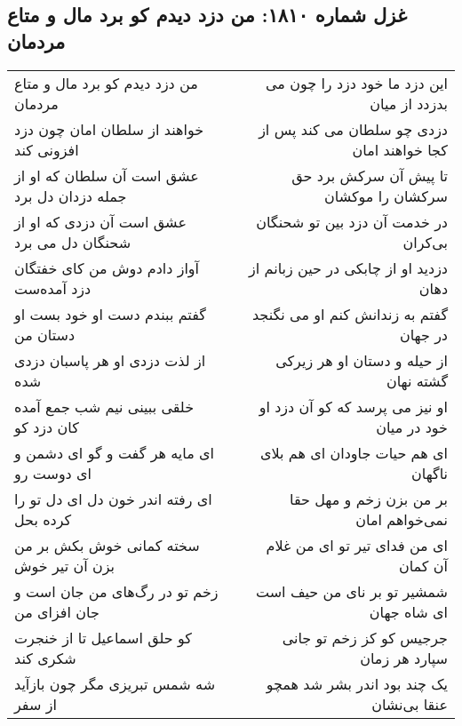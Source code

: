 \begin{center}
\section*{غزل شماره ۱۸۱۰: من دزد دیدم کو برد مال و متاع مردمان}
\label{sec:1810}
\begin{longtable}{l p{0.5cm} r}
من دزد دیدم کو برد مال و متاع مردمان
&&
این دزد ما خود دزد را چون می بدزدد از میان
\\
خواهند از سلطان امان چون دزد افزونی کند
&&
دزدی چو سلطان می کند پس از کجا خواهند امان
\\
عشق است آن سلطان که او از جمله دزدان دل برد
&&
تا پیش آن سرکش برد حق سرکشان را موکشان
\\
عشق است آن دزدی که او از شحنگان دل می برد
&&
در خدمت آن دزد بین تو شحنگان بی‌کران
\\
آواز دادم دوش من کای خفتگان دزد آمده‌ست
&&
دزدید او از چابکی در حین زبانم از دهان
\\
گفتم ببندم دست او خود بست او دستان من
&&
گفتم به زندانش کنم او می نگنجد در جهان
\\
از لذت دزدی او هر پاسبان دزدی شده
&&
از حیله و دستان او هر زیرکی گشته نهان
\\
خلقی ببینی نیم شب جمع آمده کان دزد کو
&&
او نیز می پرسد که کو آن دزد او خود در میان
\\
ای مایه هر گفت و گو ای دشمن و ای دوست رو
&&
ای هم حیات جاودان ای هم بلای ناگهان
\\
ای رفته اندر خون دل ای دل تو را کرده بحل
&&
بر من بزن زخم و مهل حقا نمی‌خواهم امان
\\
سخته کمانی خوش بکش بر من بزن آن تیر خوش
&&
ای من فدای تیر تو ای من غلام آن کمان
\\
زخم تو در رگ‌های من جان است و جان افزای من
&&
شمشیر تو بر نای من حیف است ای شاه جهان
\\
کو حلق اسماعیل تا از خنجرت شکری کند
&&
جرجیس کو کز زخم تو جانی سپارد هر زمان
\\
شه شمس تبریزی مگر چون بازآید از سفر
&&
یک چند بود اندر بشر شد همچو عنقا بی‌نشان
\\
\end{longtable}
\end{center}
